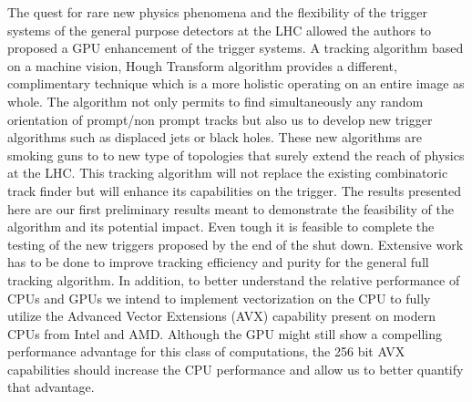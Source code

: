 \documentclass{JINST}
\begin{document}
The quest for rare new physics phenomena and the flexibility of the trigger systems of the general purpose detectors at the LHC 
allowed the authors to proposed a GPU enhancement of the trigger systems.  A tracking algorithm based on a machine vision, Hough Transform algorithm provides
a different, complimentary technique  which is a more holistic operating on an entire image as whole. The algorithm not only permits to find simultaneously any
 random orientation of prompt/non prompt tracks but also us to develop new trigger algorithms such as displaced jets or black holes. These new algorithms are smoking guns to 
to new type of topologies  that surely extend the reach of physics at the LHC. This tracking algorithm will not replace the existing combinatoric track 
finder but will enhance its capabilities on the trigger. The results presented here are our first preliminary results meant to demonstrate the feasibility of the 
algorithm and its potential impact. Even tough it is feasible to complete the testing of the new triggers proposed by the end of the shut down.
Extensive work has to be done to improve tracking efficiency and purity for the general full tracking algorithm. In addition, 
to better understand the relative performance of CPUs and GPUs we intend to implement vectorization on the CPU to fully utilize the Advanced Vector Extensions (AVX) 
capability present on modern CPUs from Intel and AMD.  Although the GPU might still show a compelling performance advantage for this class of computations, 
the 256 bit AVX capabilities should increase the CPU performance and allow us to better quantify that advantage.


\end{document}
